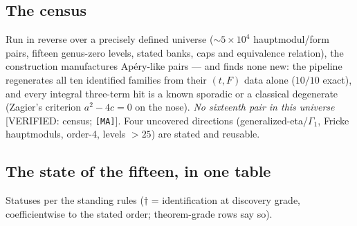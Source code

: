 \documentclass[11pt,reqno]{amsart}
\theoremstyle{plain}
\theoremstyle{definition}
\theoremstyle{remark}
\newcommand{\VerifiedR}[1]{\textup{\textsf{[VERIFIED: #1]}}}
\newcommand{\MA}{\texttt{[MA]}}
\begin{document}
\subsection{The census}
Run in reverse over a precisely defined universe ($\sim5\times10^4$
hauptmodul/form pairs, fifteen genus-zero levels, stated banks, caps and
equivalence relation), the construction manufactures Ap\'ery-like pairs
--- and finds none new: the pipeline regenerates all ten identified
families from their $(t,F)$ data alone ($10/10$ exact), and every
integral three-term hit is a known sporadic or a classical degenerate
(Zagier's criterion $a^2-4c=0$ on the nose). \emph{No sixteenth pair in
this universe} \VerifiedR{census; \MA}. Four uncovered directions
(generalized-eta/$\Gamma_1$, Fricke hauptmoduls, order-4, levels $>25$)
are stated and reusable.

\subsection{The state of the fifteen, in one table}
Statuses per the standing rules ($\dagger$ = identification at
discovery grade, coefficientwise to the stated order; theorem-grade rows
say so).
\end{document}
